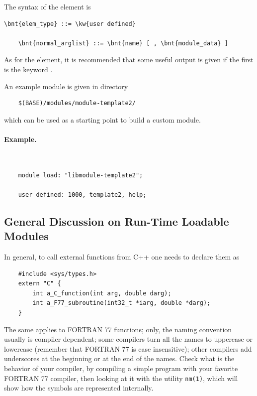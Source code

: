 The syntax of the  element is
\begin{Verbatim}[commandchars=\\\{\}]
    \bnt{elem_type} ::= \kw{user defined}

    \bnt{normal_arglist} ::= \bnt{name} [ , \bnt{module_data} ]
\end{Verbatim}
As for the  element, it is recommended that 
some useful output is given if the first 
is the keyword .

An example module is given in directory
\begin{verbatim}
    $(BASE)/modules/module-template2/
\end{verbatim}
which can be used as a starting point to build a custom module.

\paragraph{Example.} \
\begin{verbatim}
    module load: "libmodule-template2";

    user defined: 1000, template2, help;
\end{verbatim}



\subsection{General Discussion on Run-Time Loadable Modules}
In general, to call external functions from C++ one needs
to declare them as
\begin{verbatim}
    #include <sys/types.h>
    extern "C" {
        int a_C_function(int arg, double darg);
        int a_F77_subroutine(int32_t *iarg, double *darg);
    }
\end{verbatim}
The same applies to FORTRAN 77 functions; only, the naming convention
usually is compiler dependent; some compilers turn all the names to 
uppercase or lowercase (remember that FORTRAN 77 is case insensitive);
other compilers add underscores at the beginning or at the end of the
names.
Check what is the behavior of your compiler, by compiling a simple 
program with your favorite FORTRAN 77 compiler, then looking at it
with the utility \texttt{nm(1)}, which will show how the symbols are represented 
internally.

